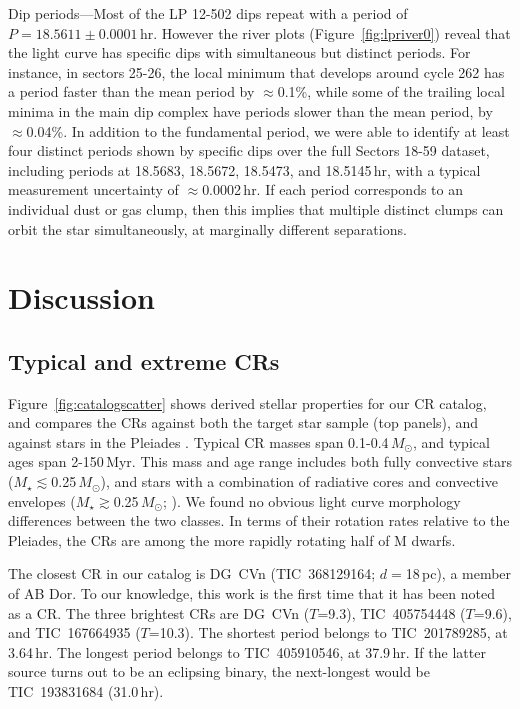 \documentclass[11pt,twocolumn,tighten]{aastex63}
\begin{document}
{\sc Dip periods}---Most of the LP 12-502 dips repeat with a period of
$P=18.5611 \pm 0.0001$\,hr.  However the river plots
(Figure~\ref{fig:lpriver0}) reveal that the light curve has specific
dips with simultaneous but distinct periods.  For instance, in sectors
25-26, the local minimum that develops around cycle 262 has a period
faster than the mean period by $\approx$0.1\%, while some of the
trailing local minima in the main dip complex have periods slower than
the mean period, by $\approx$0.04\%.  In addition to the fundamental
period, we were able to identify at least four distinct periods shown
by specific dips over the full Sectors 18-59 dataset, including
periods at 18.5683, 18.5672, 18.5473, and 18.5145\,hr, with a typical
measurement uncertainty of $\approx$0.0002\,hr.  If each period
corresponds to an individual dust or gas clump, then this implies that
multiple distinct clumps can orbit the star simultaneously, at
marginally different separations.



\section{Discussion}
\label{sec:discussion}


\subsection{Typical and extreme CRs}
\label{subsec:extreme}

Figure~\ref{fig:catalogscatter} shows derived stellar properties for
our CR catalog, and compares the CRs against both the target star
sample (top panels), and against stars in the Pleiades
\citep{2016AJ....152..114R}.  Typical CR masses span
0.1-0.4\,$M_\odot$, and typical ages span 2-150\,Myr.  This mass and
age range includes both fully convective stars
($M_\star$$\lesssim$0.25\,$M_\odot$), and stars with a combination of
radiative cores and convective envelopes
($M_\star$$\gtrsim$0.25\,$M_\odot$; \citealt{2018A&A...619A.177B}).
We found no obvious light curve morphology differences between the two
classes.  In terms of their rotation rates relative to the Pleiades,
the CRs are among the more rapidly rotating half of M dwarfs. 

The closest CR in our catalog is DG~CVn (TIC~368129164;
$d$$=$18\,pc), a member of AB Dor.  To our knowledge, this work is the
first time that it has been noted as a CR.  The three brightest CRs
are DG~CVn ($T$=9.3), TIC~405754448 ($T$=9.6), and TIC~167664935
($T$=10.3).  The shortest period belongs to TIC~201789285, at
3.64\,hr.  The longest period belongs to TIC~405910546, at 37.9\,hr.
If the latter source turns out to be an eclipsing binary, the
next-longest would be TIC~193831684 (31.0\,hr).
\end{document}
